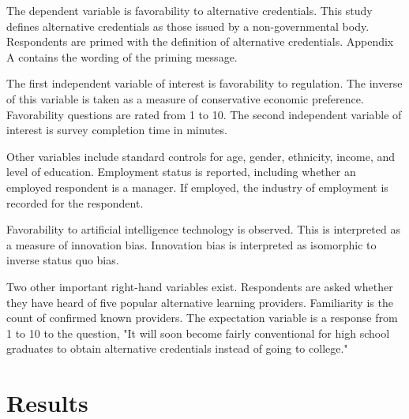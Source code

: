 \documentclass[review]{elsarticle}
\begin{document}
The dependent variable is favorability to alternative credentials.
This study defines alternative credentials as those issued by a non-governmental body.
Respondents are primed with the definition of alternative credentials.
Appendix A contains the wording of the priming message.

The first independent variable of interest is favorability to regulation.
The inverse of this variable is taken as a measure of conservative economic preference.
Favorability questions are rated from 1 to 10.
The second independent variable of interest is survey completion time in minutes.

Other variables include standard controls for age,
gender, ethnicity, income, and level of education.
Employment status is reported, including whether an employed respondent is a manager.
If employed, the industry of employment is recorded for the respondent.

Favorability to artificial intelligence technology is observed.
This is interpreted as a measure of innovation bias.
Innovation bias is interpreted as isomorphic to inverse status quo bias.

Two other important right-hand variables exist.
Respondents are asked whether they have heard of five popular alternative learning providers.
Familiarity is the count of confirmed known providers.
The expectation variable is a response from 1 to 10 to the question,
"It will soon become fairly conventional for high school graduates to obtain alternative credentials instead of going to college."

%

\section{Results}
\end{document}
